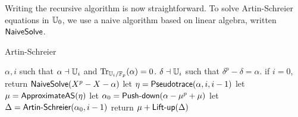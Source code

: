 
\smallskip

Writing the recursive algorithm is now straightforward. To solve
Artin-Schreier equations in $\mathbb{U}_0$, we use a naive algorithm based on
linear algebra, written ${\sf NaiveSolve}$.


\begin{algorithm}
  \caption{Artin-Schreier}
  \begin{algorithmic}[1]
    \REQUIRE $\alpha,i$ such that $\alpha\dashv\mathbb{U}_i$ and $\operatorname{Tr}_{\mathbb{U}_i/\mathbb{F}_p}(\alpha)=0$.
    \ENSURE $\delta\dashv\mathbb{U}_i$ such that $\delta^p-\delta=\alpha$.
    \STATE \label{alg:cou:base}if $i=0$, return ${\sf NaiveSolve}(X^p-X-\alpha)$
    \STATE \label{alg:cou:pseudo} let $\eta = {\sf Pseudotrace}(\alpha, i,i-1)$
    \STATE \label{alg:cou:push-beta} let $\mu= {\sf ApproximateAS}(\eta)$
    \STATE \label{alg:cou:push-alpha} let $\alpha_0=\text{{\sf Push-down}}(\alpha-\mu^p+\mu)$
    \STATE \label{alg:cou:rec} let $\Delta =\text{{\sf Artin-Schreier}}(\alpha_0,i-1)$
    \STATE \label{alg:cou:lift} return $\mu+\text{{\sf Lift-up}}(\Delta)$
  \end{algorithmic}
\end{algorithm}


